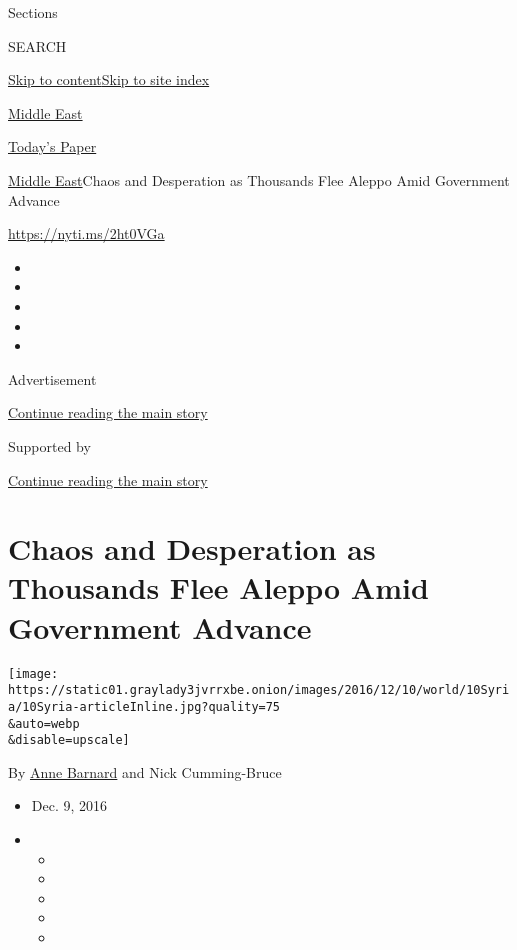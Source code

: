 Sections

SEARCH

\protect\hyperlink{site-content}{Skip to
content}\protect\hyperlink{site-index}{Skip to site index}

\href{https://www.nytimes3xbfgragh.onion/section/world/middleeast}{Middle
East}

\href{https://myaccount.nytimes3xbfgragh.onion/auth/login?response_type=cookie\&client_id=vi}{}

\href{https://www.nytimes3xbfgragh.onion/section/todayspaper}{Today's
Paper}

\href{/section/world/middleeast}{Middle East}\textbar{}Chaos and
Desperation as Thousands Flee Aleppo Amid Government Advance

\url{https://nyti.ms/2ht0VGa}

\begin{itemize}
\item
\item
\item
\item
\item
\end{itemize}

Advertisement

\protect\hyperlink{after-top}{Continue reading the main story}

Supported by

\protect\hyperlink{after-sponsor}{Continue reading the main story}

\hypertarget{chaos-and-desperation-as-thousands-flee-aleppo-amid-government-advance}{%
\section{Chaos and Desperation as Thousands Flee Aleppo Amid Government
Advance}\label{chaos-and-desperation-as-thousands-flee-aleppo-amid-government-advance}}

\texttt{[image: https://static01.graylady3jvrrxbe.onion/images/2016/12/10/world/10Syria/10Syria-articleInline.jpg?quality=75\\\&auto=webp\\\&disable=upscale]}

By \href{http://www.nytimes3xbfgragh.onion/by/anne-barnard}{Anne
Barnard} and Nick Cumming-Bruce

\begin{itemize}
\item
  Dec. 9, 2016
\item
  \begin{itemize}
  \item
  \item
  \item
  \item
  \item
  \end{itemize}
\end{itemize}

